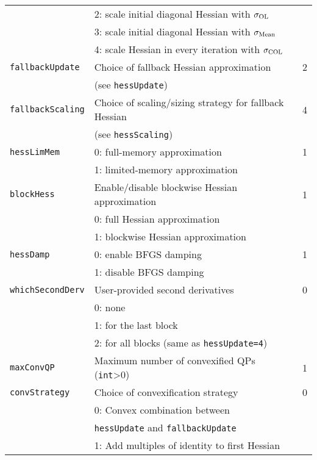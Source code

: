 \documentclass[	11pt,
				a4paper,
				abstract=true,
				twoside=true,
				bibliography=totoc, 
				headinclude=true,
				footinclude=false]{scrartcl}
\begin{document}
\begin{longtable}[c]{lll}
								& 2: scale initial diagonal Hessian with $\sigma_{\textup{OL}}$	&			\\
								& 3: scale initial diagonal Hessian with $\sigma_{\textup{Mean}}$	&		\\
								& 4: scale Hessian in every iteration with $\sigma_{\textup{COL}}$	&		\\\hline
%
\texttt{fallbackUpdate}			& Choice of fallback Hessian approximation						& 2			\\
								& (see \texttt{hessUpdate})										&			\\\hline
%
\texttt{fallbackScaling}		& Choice of scaling/sizing strategy for fallback Hessian		& 4			\\
								& (see \texttt{hessScaling})									&			\\\hline
%
\texttt{hessLimMem}				& 0: full-memory approximation									& 1			\\
								& 1: limited-memory approximation								&			\\\hline
%
\texttt{blockHess}				& Enable/disable blockwise Hessian approximation				& 1			\\
								& 0: full Hessian approximation									&			\\
								& 1: blockwise Hessian approximation							&			\\\hline

%
\texttt{hessDamp}				& 0: enable BFGS damping										& 1			\\
								& 1: disable BFGS damping										&			\\\hline
%
\texttt{whichSecondDerv}		& User-provided second derivatives								& 0			\\
								& 0: none														&			\\
								& 1: for the last block											&			\\
								& 2: for all blocks (same as \texttt{hessUpdate=4})				&			\\\hline
\texttt{maxConvQP}				& Maximum number of convexified QPs (\texttt{int}>0)			& 1			\\\hline
%
\texttt{convStrategy}			& Choice of convexification strategy							& 0			\\
								& 0: Convex combination between									&			 \\
								& \phantom{0: }\texttt{hessUpdate} and \texttt{fallbackUpdate}	&			\\
								& 1: Add multiples of identity to first Hessian					&			\\\hline
\end{longtable}
\end{document}
